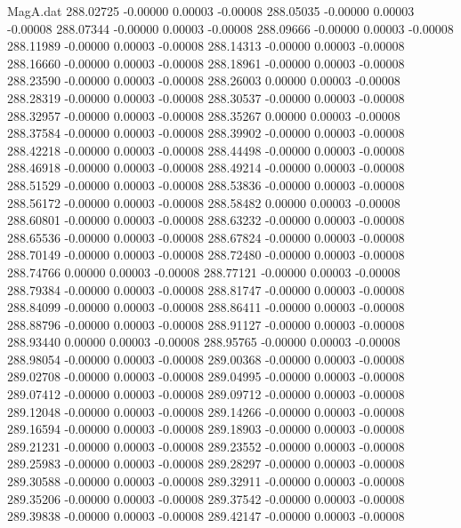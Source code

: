 \begin{filecontents}{MagA.dat}
 288.02725   -0.00000    0.00003   -0.00008
 288.05035   -0.00000    0.00003   -0.00008
 288.07344   -0.00000    0.00003   -0.00008
 288.09666   -0.00000    0.00003   -0.00008
 288.11989   -0.00000    0.00003   -0.00008
 288.14313   -0.00000    0.00003   -0.00008
 288.16660   -0.00000    0.00003   -0.00008
 288.18961   -0.00000    0.00003   -0.00008
 288.23590   -0.00000    0.00003   -0.00008
 288.26003    0.00000    0.00003   -0.00008
 288.28319   -0.00000    0.00003   -0.00008
 288.30537   -0.00000    0.00003   -0.00008
 288.32957   -0.00000    0.00003   -0.00008
 288.35267    0.00000    0.00003   -0.00008
 288.37584   -0.00000    0.00003   -0.00008
 288.39902   -0.00000    0.00003   -0.00008
 288.42218   -0.00000    0.00003   -0.00008
 288.44498   -0.00000    0.00003   -0.00008
 288.46918   -0.00000    0.00003   -0.00008
 288.49214   -0.00000    0.00003   -0.00008
 288.51529   -0.00000    0.00003   -0.00008
 288.53836   -0.00000    0.00003   -0.00008
 288.56172   -0.00000    0.00003   -0.00008
 288.58482    0.00000    0.00003   -0.00008
 288.60801   -0.00000    0.00003   -0.00008
 288.63232   -0.00000    0.00003   -0.00008
 288.65536   -0.00000    0.00003   -0.00008
 288.67824   -0.00000    0.00003   -0.00008
 288.70149   -0.00000    0.00003   -0.00008
 288.72480   -0.00000    0.00003   -0.00008
 288.74766    0.00000    0.00003   -0.00008
 288.77121   -0.00000    0.00003   -0.00008
 288.79384   -0.00000    0.00003   -0.00008
 288.81747   -0.00000    0.00003   -0.00008
 288.84099   -0.00000    0.00003   -0.00008
 288.86411   -0.00000    0.00003   -0.00008
 288.88796   -0.00000    0.00003   -0.00008
 288.91127   -0.00000    0.00003   -0.00008
 288.93440    0.00000    0.00003   -0.00008
 288.95765   -0.00000    0.00003   -0.00008
 288.98054   -0.00000    0.00003   -0.00008
 289.00368   -0.00000    0.00003   -0.00008
 289.02708   -0.00000    0.00003   -0.00008
 289.04995   -0.00000    0.00003   -0.00008
 289.07412   -0.00000    0.00003   -0.00008
 289.09712   -0.00000    0.00003   -0.00008
 289.12048   -0.00000    0.00003   -0.00008
 289.14266   -0.00000    0.00003   -0.00008
 289.16594   -0.00000    0.00003   -0.00008
 289.18903   -0.00000    0.00003   -0.00008
 289.21231   -0.00000    0.00003   -0.00008
 289.23552   -0.00000    0.00003   -0.00008
 289.25983   -0.00000    0.00003   -0.00008
 289.28297   -0.00000    0.00003   -0.00008
 289.30588   -0.00000    0.00003   -0.00008
 289.32911   -0.00000    0.00003   -0.00008
 289.35206   -0.00000    0.00003   -0.00008
 289.37542   -0.00000    0.00003   -0.00008
 289.39838   -0.00000    0.00003   -0.00008
 289.42147   -0.00000    0.00003   -0.00008

\end{filecontents}
